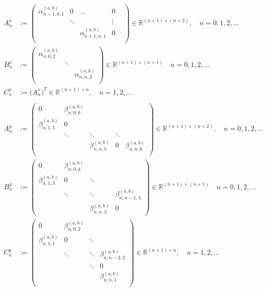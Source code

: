 \documentclass[11pt, oneside]{article}   	%
\newcommand{\R}{\mathbb{R}}
\newcommand{\alphaab}{\alpha^{(a,b)}}
\newcommand{\betaab}{\beta^{(a,b)}}
\begin{document}
\begin{align}
A^x_n &:= \begin{pmatrix}
		\alphaab_{n+1,0,1} & 0 & \hdots & 0 \\
		& \ddots & & \vdots & \\
		& & \alphaab_{n+1,n,1} & 0 \\
	    \end{pmatrix} \in \R^{(n+1)\times(n+2)}, \quad n = 0,1,2,\dots \\
B^x_n &:= \begin{pmatrix}
		\alphaab_{n,0,2} & & \\
		& \ddots & \\
		& & \alphaab_{n,n,2} \\
	    \end{pmatrix} \in \R^{(n+1)\times(n+1)} \quad n = 0,1,2,\dots \\
C^x_n &:= \big( A^x_n \big)^T \in \R^{(n+1)\times n},  \quad n = 1,2,\dots \\ 
\nonumber \\
A^y_n &:= \begin{pmatrix}
		0 & \betaab_{n,0,6} & & & \\
		\betaab_{n,1,5} & 0 & & & \\
		& \ddots & \ddots & \ddots & \\
		& & \betaab_{n,n,5}& 0 & \betaab_{n,n,6} \\
	    \end{pmatrix} \in \R^{(n+1)\times(n+2)}, \quad n = 0,1,2,\dots \\
B^y_n &:= \begin{pmatrix}
		0 & \betaab_{n,0,4} & & \\
		\betaab_{n,1,3} & 0 & \ddots & \\
		& \ddots & \ddots & \betaab_{n,n-1,4} \\
		& & \betaab_{n,n,3} & 0
	    \end{pmatrix} \in \R^{(n+1)\times(n+1)}  \quad n = 0,1,2,\dots \\
C^y_n &:= \begin{pmatrix}
		0 & \betaab_{n,0,2} & & \\
		\betaab_{n,1,1} & 0 & \ddots & \\
		& \ddots & \ddots & \betaab_{n,n-2,2} \\
		& & \ddots & 0 \\
		& & & \betaab_{n,n,1} \\
	    \end{pmatrix} \in \R^{(n+1)\times n}, \quad n = 1,2,\dots
\end{align}
\end{document}
